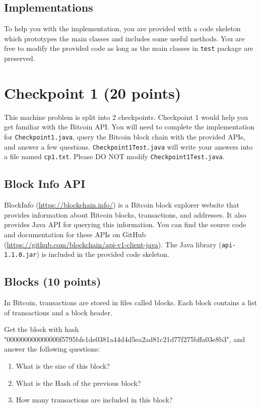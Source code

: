 \documentclass[letterpaper,12pt]{report}
\begin{document}
\subsection*{Implementations}

To help you with the implementation, you are provided with a code skeleton which prototypes the main classes and includes some useful methods. You are free to modify the provided code as long as the main classes in \texttt{test} package are preserved.

\setcounter{chapter}{3}

\section{Checkpoint 1 (20 points)}
\label{sec:checkpoint_1}
This machine problem is split into 2 checkpoints. Checkpoint 1 would help you get familiar with the Bitcoin API. You will need to complete the implementation for \texttt{Checkpoint1.java}, query the Bitcoin block chain with the provided APIs, and answer a few questions. \texttt{Checkpoint1Test.java} will write your answers into a file named \texttt{cp1.txt}. Please DO NOT modify \texttt{Checkpoint1Test.java}.

\smallskip

\subsection{Block Info API}
BlockInfo (\url{https://blockchain.info/}) is a Bitcoin block explorer website that provides information about Bitcoin blocks, transactions, and addresses. It also provides Java API for querying this information. You can find the source code and documentation for these APIs on GitHub (\url{https://github.com/blockchain/api-v1-client-java}). The Java library (\texttt{api-1.1.0.jar}) is included in the provided code skeleton.

\subsection{Blocks (10 points)}  \label{subsec:Blocks} 
In Bitcoin, transactions are stored in files called blocks. Each block contains a list of transactions and a block header. 

Get the block with hash "000000000000000f5795bfe1de0381a44d4d5ea2ad81c21d77f275bffa03e8b3", and answer the following questions:
\begin{enumerate}
	\item What is the size of this block? 
	\item What is the Hash of the previous block? 
	\item How many transactions are included in this block? 
\end{enumerate}
\end{document}
